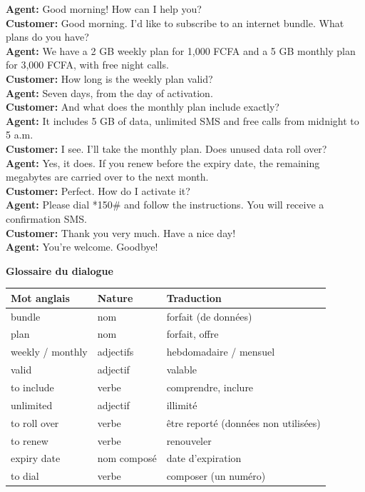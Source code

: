 \documentclass[11pt]{article}
\begin{document}
\begin{textebox}
\textbf{Agent:} Good morning! How can I help you?\\
\textbf{Customer:} Good morning. I'd like to subscribe to an internet bundle. What plans do you have?\\
\textbf{Agent:} We have a 2 GB weekly plan for 1,000 FCFA and a 5 GB monthly plan for 3,000 FCFA, with free night calls.\\
\textbf{Customer:} How long is the weekly plan valid?\\
\textbf{Agent:} Seven days, from the day of activation.\\
\textbf{Customer:} And what does the monthly plan include exactly?\\
\textbf{Agent:} It includes 5 GB of data, unlimited SMS and free calls from midnight to 5 a.m.\\
\textbf{Customer:} I see. I'll take the monthly plan. Does unused data roll over?\\
\textbf{Agent:} Yes, it does. If you renew before the expiry date, the remaining megabytes are carried over to the next month.\\
\textbf{Customer:} Perfect. How do I activate it?\\
\textbf{Agent:} Please dial *150\# and follow the instructions. You will receive a confirmation SMS.\\
\textbf{Customer:} Thank you very much. Have a nice day!\\
\textbf{Agent:} You're welcome. Goodbye!
\end{textebox}

\textbf{Glossaire du dialogue}

\begin{center}
\begin{tabularx}{\linewidth}{|l|X|l|}\hline
\rowcolor{popblueL} \textbf{Mot anglais} & \textbf{Nature} & \textbf{Traduction} \\ \hline
bundle & nom & forfait (de données) \\ \hline
plan & nom & forfait, offre \\ \hline
weekly / monthly & adjectifs & hebdomadaire / mensuel \\ \hline
valid & adjectif & valable \\ \hline
to include & verbe & comprendre, inclure \\ \hline
unlimited & adjectif & illimité \\ \hline
to roll over & verbe & être reporté (données non utilisées) \\ \hline
to renew & verbe & renouveler \\ \hline
expiry date & nom composé & date d'expiration \\ \hline
to dial & verbe & composer (un numéro) \\ \hline
\end{tabularx}
\end{center}
\end{document}
